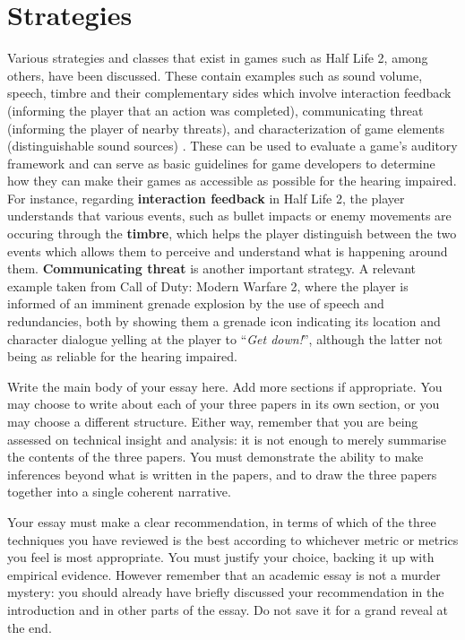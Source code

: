 \documentclass{scrartcl}
\begin{document}
\section{Strategies}
Various strategies and classes that exist in games such as Half Life 2, among others, have been discussed. These contain examples such as sound volume, speech, timbre and their complementary sides which involve interaction feedback (informing the player that an action was completed), communicating threat (informing the player of nearby threats), and characterization of game elements (distinguishable sound sources) \cite{Denise}. These can be used to evaluate a game's auditory framework and can serve as basic guidelines for game developers to determine how they can make their games as accessible as possible for the hearing impaired. For instance, regarding \textbf{interaction feedback} in Half Life 2, the player understands that various events, such as bullet impacts or enemy movements are occuring through the \textbf{timbre}, which helps the player distinguish between the two events which allows them to perceive and understand what is happening around them. \textbf{Communicating threat} is another important strategy. A relevant example taken from Call of Duty: Modern Warfare 2, where the player is informed of an imminent grenade explosion by the use of speech and redundancies, both by showing them a grenade icon indicating its location and character dialogue yelling at the player to  ``\textit{Get down!}'', although the latter not being as reliable for the hearing impaired. \cite{Denise}


Write the main body of your essay here. Add more sections if appropriate. You may choose to write about each of your three papers in its own section, or you may choose a different structure. Either way, remember that you are being assessed on technical insight and analysis: it is not enough to merely summarise the contents of the three papers. You must demonstrate the ability to make inferences beyond what is written in the papers, and to draw the three papers together into a single coherent narrative.

Your essay must make a clear recommendation, in terms of which of the three techniques you have reviewed is the best according to whichever metric or metrics you feel is most appropriate. You must justify your choice, backing it up with empirical evidence. However remember that an academic essay is not a murder mystery: you should already have briefly discussed your recommendation in the introduction and in other parts of the essay. Do not save it for a grand reveal at the end.
\end{document}
